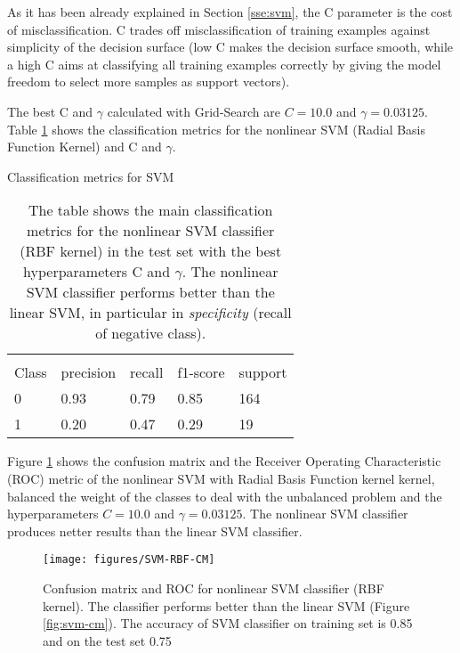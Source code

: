 \documentclass[11pt]{article}
\begin{document}
As it has been already explained in Section \ref{sse:svm}, the C parameter is the cost of misclassification. C trades off misclassification of training examples against simplicity of the decision surface (low C makes the decision surface smooth, while a high C aims at classifying all training examples correctly by giving the model freedom to select more samples as support vectors). 


The best C and $\gamma$ calculated with Grid-Search are $C= 10.0$ and $\gamma= 0.03125$. %
Table \ref{tab:svmnonlinear} shows the classification metrics for the nonlinear SVM (Radial Basis Function Kernel) and C and $\gamma$.

\begin{table}[H]
\caption{Classification metrics for SVM} \label{tab:svmnonlinear} 
\begin{center} 
\begin{tabular}{lllll}
\hline
\multicolumn{1}{c}{} \\
Class & precision & recall & f1-score & support     \\
\hline
0 & 0.93  &    0.79   &   0.85   &    164 \\
1 & 0.20  &    0.47   &   0.29   &    19 \\
\hline
\end{tabular}
\caption{The table shows the main classification metrics for the nonlinear SVM classifier (RBF kernel) in the test set with the best hyperparameters C and $\gamma$. The nonlinear SVM classifier performs better than the linear SVM, in particular in \emph{specificity} (recall of negative class).}
\end{center}
\end{table}

Figure \ref{fig:svm-rbf-cm} shows the confusion matrix and the Receiver Operating Characteristic (ROC) metric of the nonlinear SVM with Radial Basis Function kernel kernel, balanced the weight of the classes to deal with the unbalanced problem and the hyperparameters $C= 10.0$ and $\gamma= 0.03125$. The nonlinear SVM classifier produces netter results than the linear SVM classifier.

\begin{figure}[H]
        \centering
        \texttt{[image: figures/SVM-RBF-CM]}
        \caption{Confusion matrix and ROC for nonlinear SVM classifier (RBF kernel). The classifier performs better than the linear SVM (Figure \ref{fig:svm-cm}). The accuracy of SVM classifier on training set is 0.85 and on the test set 0.75}
\label{fig:svm-rbf-cm}
\end{figure}
\end{document}

